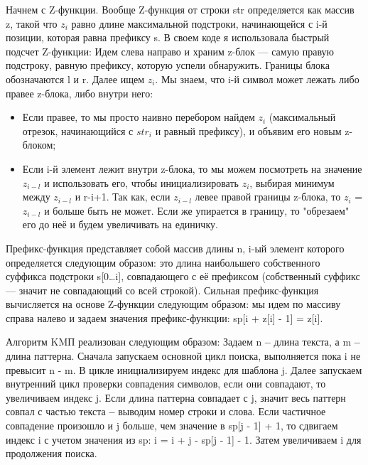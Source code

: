 \documentclass[12pt]{article}
\begin{document}
Начнем с Z-функции. Вообще Z-функция от строки str определяется как массив z, такой что \(z_{i}\) равно длине максимальной подстроки, начинающейся с i-й позиции, которая равна префиксу s.
В своем коде я использовала быстрый подсчет Z-функции: 
Идем слева направо и храним z-блок — самую правую подстроку, равную префиксу, которую успели обнаружить. Границы блока обозначаются l и r. Далее ищем \(z_{i}\). Мы знаем, что i-й символ может лежать либо правее z-блока, либо внутри него:
\begin{itemize}
\item Если правее, то мы просто наивно перебором найдем \(z_{i}\) (максимальный отрезок, начинающийся с \(str_{i}\) и равный префиксу), и объявим его новым z-блоком;
\item Если i-й элемент лежит внутри z-блока, то мы можем посмотреть на значение \(z_{i-l}\) и использовать его, чтобы инициализировать \(z_{i}\), выбирая минимум между \(z_{i-l}\) и r-i+1. Так как, если \(z_{i-l}\) левее правой границы z-блока, то \(z_{i}\) = \(z_{i-l}\) и больше быть не может. Если же упирается в границу, то "обрезаем" его до неё и будем увеличивать на единичку.
\end{itemize}

Префикс-функция представляет собой массив длины n, i-ый элемент которого определяется следующим образом: это длина наибольшего собственного суффикса подстроки s[0…i], совпадающего с её префиксом (собственный суффикс — значит не совпадающий со всей строкой). Сильная префикс-функция вычисляется на основе Z-функции следующим образом: мы идем по массиву справа налево и задаем значения префикс-функции: sp[i + z[i] - 1] = z[i].

Алгоритм KMП реализован следующим образом: Задаем n \textbf{--} длина текста, а m \textbf{--} длина паттерна. Сначала запускаем основной цикл поиска, выполняется пока i не превысит n - m. В цикле инициализируем индекс для шаблона j. Далее запускаем внутренний цикл проверки совпадения символов, если они совпадают, то увеличиваем индекс j. Если длина паттерна совпадает с j, значит весь паттерн совпал с частью текста \textbf{--} выводим номер строки и слова. Если частичное совпадение произошло и j больше, чем значение в sp[j - 1] + 1, то сдвигаем индекс i с учетом значения из sp: i = i + j - sp[j - 1] - 1. Затем увеличиваем i для продолжения поиска.
\end{document}
